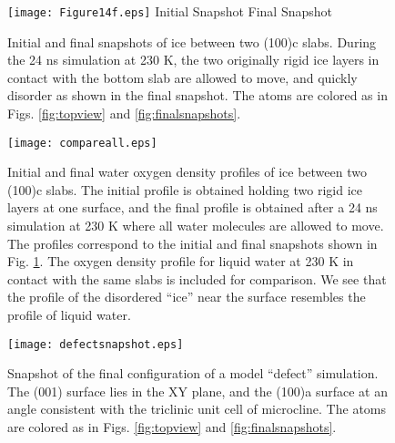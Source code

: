 \documentclass[preprint,aps,prb,floatfix]{revtex4-1}
\begin{document}
\clearpage
\begin{figure}
    \centering
    \texttt{[image: Figure14f.eps]}\vspace{-0.75cm}
    \newline
   Initial Snapshot          \quad\quad\quad\quad\quad\quad\quad\quad\quad\quad\quad\quad\quad\quad Final Snapshot
    \caption{Initial and final snapshots of ice between two (100)c slabs. During the 24 ns simulation at 230 K, the two originally rigid ice layers in contact with the bottom slab are allowed to move, and quickly disorder as shown in the final snapshot. The atoms are colored as in Figs. \ref{fig:topview} and \ref{fig:finalsnapshots}.}
        \label{fig:snapshotsinitialfinal}
\end{figure}

\clearpage
\begin{figure}
    \centering
   \texttt{[image: compareall.eps]}
    \caption{Initial and final water oxygen density profiles of ice between two (100)c slabs. The initial profile is obtained holding two rigid ice layers at one surface, and the final profile is obtained after a 24 ns simulation at 230 K where all water molecules are allowed to move. The profiles correspond to the initial and final snapshots shown in Fig. \ref{fig:snapshotsinitialfinal}. The oxygen density profile for liquid water at 230 K in contact with the same slabs is included for comparison. We see that the profile of the disordered ``ice'' near the surface resembles the profile of liquid water.}    
     \label{fig:oxygendensity}
\end{figure}

\clearpage
\begin{figure}
    \centering
\texttt{[image: defectsnapshot.eps]}    
          \caption{Snapshot of the final configuration of a model ``defect'' simulation. The (001) surface lies in the XY plane, and the (100)a surface at an angle consistent with the triclinic unit cell of microcline. The atoms are colored as in Figs. \ref{fig:topview} and \ref{fig:finalsnapshots}.}
         \label{fig:defectsnapshot}
\end{figure}
\end{document}
